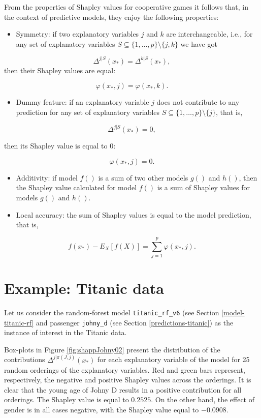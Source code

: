 \documentclass[]{krantz}
\providecommand{\tightlist}{%
  \setlength{\itemsep}{0pt}\setlength{\parskip}{0pt}}
\begin{document}
From the properties of Shapley values for cooperative games it follows that, in the context of predictive models, they enjoy the following properties:

\begin{itemize}
\tightlist
\item
  Symmetry: if two explanatory variables \(j\) and \(k\) are interchangeable, i.e., for any set of explanatory variables \(S \subseteq \{1,\dots,p\}\setminus \{j,k\}\) we have got
\end{itemize}

\[
\Delta^{j|S}(x_*) = \Delta^{k|S}(x_*),
\]
then their Shapley values are equal:

\[
\varphi(x_*,j) = \varphi(x_*,k).
\]

\begin{itemize}
\tightlist
\item
  Dummy feature: if an explanatory variable \(j\) does not contribute to any prediction for any set of explanatory variables \(S \subseteq \{1,\dots,p\}\setminus \{j\}\), that is,
\end{itemize}

\[
\Delta^{j|S}(x_*) = 0,
\]

then its Shapley value is equal to 0:

\[
\varphi(x_*,j) = 0.
\]

\begin{itemize}
\item
  Additivity: if model \(f()\) is a sum of two other models \(g()\) and \(h()\), then the Shapley value calculated for model \(f()\) is a sum of Shapley values for models \(g()\) and \(h()\).
\item
  Local accuracy: the sum of Shapley values is equal to the model prediction, that is,
\end{itemize}

\[
f(x_*) - E_X[f(X)] = \sum_{j=1}^p   \varphi(x_*,j). 
\]

\hypertarget{SHAPExample}{%
\section{Example: Titanic data}\label{SHAPExample}}

Let us consider the random-forest model \texttt{titanic\_rf\_v6} (see Section \ref{model-titanic-rf} and passenger \texttt{johny\_d} (see Section \ref{predictions-titanic}) as the instance of interest in the Titanic data.

Box-plots in Figure \ref{fig:shappJohny02} present the distribution of the contributions \(\Delta^{j|\pi(J,j)}(x_*)\) for each explanatory variable of the model for 25 random orderings of the explanatory variables. Red and green bars represent, respectively, the negative and positive Shapley values across the orderings. It is clear that the young age of Johny D results in a positive contribution for all orderings. The Shapley value is equal to \(0.2525\). On the other hand, the effect of gender is in all cases negative, with the Shapley value equal to \(-0.0908\).
\end{document}
